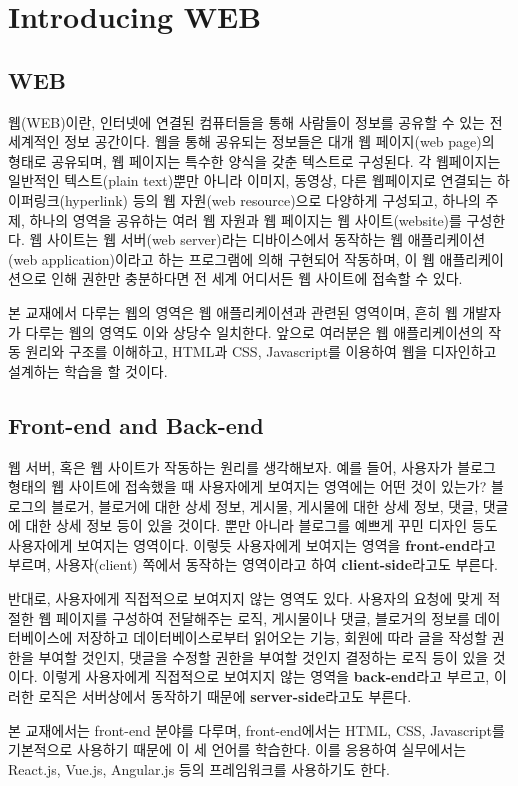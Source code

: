 \section{Introducing WEB} \label{sect:introducing-web}

\subsection*{WEB}
웹(WEB)이란, 인터넷에 연결된 컴퓨터들을 통해 사람들이 정보를 공유할 수 있는 전 세계적인 정보 공간이다. 웹을 통해 공유되는 정보들은 대개 웹 페이지(web page)의 형태로 공유되며, 웹 페이지는 특수한 양식을 갖춘 텍스트로 구성된다. 각 웹페이지는 일반적인 텍스트(plain text)뿐만 아니라 이미지, 동영상, 다른 웹페이지로 연결되는 하이퍼링크(hyperlink) 등의 웹 자원(web resource)으로 다양하게 구성되고, 하나의 주제, 하나의 영역을 공유하는 여러 웹 자원과 웹 페이지는 웹 사이트(website)를 구성한다. 웹 사이트는 웹 서버(web server)라는 디바이스에서 동작하는 웹 애플리케이션(web application)이라고 하는 프로그램에 의해 구현되어 작동하며, 이 웹 애플리케이션으로 인해 권한만 충분하다면 전 세계 어디서든 웹 사이트에 접속할 수 있다.

본 교재에서 다루는 웹의 영역은 웹 애플리케이션과 관련된 영역이며, 흔히 웹 개발자가 다루는 웹의 영역도 이와 상당수 일치한다. 앞으로 여러분은 웹 애플리케이션의 작동 원리와 구조를 이해하고, HTML과 CSS, Javascript를 이용하여 웹을 디자인하고 설계하는 학습을 할 것이다.

\subsection*{Front-end and Back-end}
웹 서버, 혹은 웹 사이트가 작동하는 원리를 생각해보자. 예를 들어, 사용자가 블로그 형태의 웹 사이트에 접속했을 때 사용자에게 보여지는 영역에는 어떤 것이 있는가? 블로그의 블로거, 블로거에 대한 상세 정보, 게시물, 게시물에 대한 상세 정보, 댓글, 댓글에 대한 상세 정보 등이 있을 것이다. 뿐만 아니라 블로그를 예쁘게 꾸민 디자인 등도 사용자에게 보여지는 영역이다. 이렇듯 사용자에게 보여지는 영역을 \textbf{front-end}라고 부르며, 사용자(client) 쪽에서 동작하는 영역이라고 하여 \textbf{client-side}라고도 부른다.

반대로, 사용자에게 직접적으로 보여지지 않는 영역도 있다. 사용자의 요청에 맞게 적절한 웹 페이지를 구성하여 전달해주는 로직, 게시물이나 댓글, 블로거의 정보를 데이터베이스에 저장하고 데이터베이스로부터 읽어오는 기능, 회원에 따라 글을 작성할 권한을 부여할 것인지, 댓글을 수정할 권한을 부여할 것인지 결정하는 로직 등이 있을 것이다. 이렇게 사용자에게 직접적으로 보여지지 않는 영역을 \textbf{back-end}라고 부르고, 이러한 로직은 서버상에서 동작하기 때문에 \textbf{server-side}라고도 부른다.

    {}

본 교재에서는 front-end 분야를 다루며, front-end에서는 HTML, CSS, Javascript를 기본적으로 사용하기 때문에 이 세 언어를 학습한다. 이를 응용하여 실무에서는 React.js, Vue.js, Angular.js 등의 프레임워크를 사용하기도 한다. 
